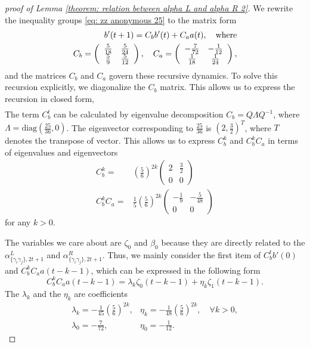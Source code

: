 \documentclass[showpacs,onecolumn,aps,prx,long bibliography,superscriptaddress,notitlepage]{revtex4-1}
\newcommand{\alpl}{\alpha_{\{\gamma_i\gamma_j\}, 2t+1}^{L}}
\newcommand{\alpr}{\alpha_{\{\gamma_i\gamma_j\}, 2t+1}^{R}}
\begin{document}
\begin{proof}[proof of Lemma \ref{theorem: relation between alpha L and alpha R 2}]
    
    We rewrite the inequality groups \eqref{eq: zz anonymous 25} to the matrix form
    \begin{align}
        b'(t+1)=C_b b'(t)+C_a a(t), \quad \text{where}\\
        C_b=\left(\begin{array}{c c}
        \frac{5}{18} & \frac{5}{24} \\ 
        \frac{5}{9} & \frac{5}{12}
        \end{array}\right), \quad C_a=\left(\begin{array}{cc}
        -\frac{7}{72} & -\frac{1}{12} \\
        \frac{1}{18} & \frac{1}{24}
        \end{array}\right),
    \end{align}
    and the matrices $C_b$ and $C_a$ govern these recursive dynamics. To solve this recursion explicitly, we diagonalize the $C_b$ matrix. This allows us to express the recursion in closed form,
    \begin{align}
    \end{align}
The term $C_b^t$ can be calculated by eigenvalue decomposition $C_b=Q \Lambda Q^{-1}$, where $\Lambda=\text{diag}(\frac{25}{36},0)$. The eigenvector corresponding to $\frac{25}{36}$ is $(2, \frac{3}{2})^T$, where $T$ denotes the transpose of vector. This allows us to express $C_b^k$ and $C_b^kC_a$ in terms of eigenvalues and eigenvectors
\begin{align}
    C_b^k=&\left(\frac{5}{6}\right)^{2k}\begin{pmatrix}
2 & \frac{3}{2} \\
0 & 0
\end{pmatrix}\\
C_b^kC_a =& \frac{1}{5}\left(\frac{5}{6}\right)^{2k}\begin{pmatrix}
-\frac{1}{9} & -\frac{5}{48} \\
0 & 0
\end{pmatrix}
\end{align}
for any $k>0$. 

The variables we care about are $\zeta_0$ and $\beta_0$ because they are directly related to the $\alpl$ and $\alpr$. Thus, we mainly consider the first item of $C_b^t b'(0)$ and $C_b^kC_aa(t-k-1)$, which can be expressed in the following form
\begin{equation}
    C_b^kC_aa(t-k-1) = \lambda_k \zeta_0(t-k-1)+\eta_k \zeta_1(t-k-1).
\end{equation}
The $\lambda_k$ and the $\eta_k$ are coefficients 
\begin{equation}
    \begin{array}{ll}
\lambda_k=-\frac{1}{45}\left(\frac{5}{6}\right)^{2 k}, & \eta_k=-\frac{1}{48}\left(\frac{5}{6}\right)^{2 k}, \quad \forall k>0,  \\
\lambda_0=-\frac{7}{72}, & \eta_0=-\frac{1}{12}.
\end{array}
\end{equation}


\end{proof}
\end{document}
